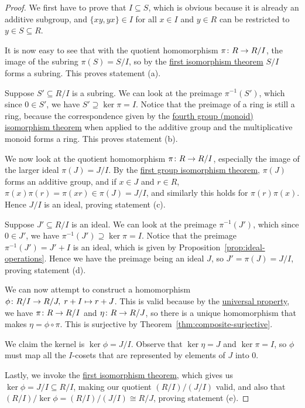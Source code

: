 \begin{proof}
    We first have to prove that \(I \subseteq S\),
    which is obvious because it is already an additive subgroup,
    and \(\{xy,yx\} \in I\) for all \(x \in I\) and \(y \in R\)
    can be restricted to \(y \in S \subseteq R\).

    It is now easy to see that
    with the quotient homomorphism \(\pi\colon R\to R/I\),
    the image of the subring \(\pi(S) = S/I\),
    so by the \hyperref[thm:iso-1-group]{first isomorphism theorem}
    \(S/I\) forms a subring.
    This proves statement (a).

    \medskip

    Suppose \(S' \subseteq R/I\) is a subring.
    We can look at the preimage \(\pi^{-1}(S')\),
    which since \(0 \in S'\), we have \(S' \supseteq \ker\pi = I\).
    Notice that the preimage of a ring is still a ring,
    because the correspondence given by
    the \hyperref[thm:iso-4-group]{fourth group (monoid) isomorphism theorem}
    when applied to the additive group and the multiplicative monoid
    forms a ring.
    This proves statement (b).

    \medskip

    We now look at the quotient homomorphism \(\pi\colon R\to R/I\),
    especially the image of the larger ideal \(\pi(J) = J/I\).
    By the \hyperref[thm:iso-1-group]{first group isomorphism theorem},
    \(\pi(J)\) forms an additive group,
    and if \(x \in J\) and \(r \in R\),
    \(\pi(x)\pi(r) = \pi(xr) \in \pi(J) = J/I\),
    and similarly this holds for \(\pi(r)\pi(x)\).
    Hence \(J/I\) is an ideal, proving statement (c).

    \medskip

    Suppose \(J' \subseteq R/I\) is an ideal.
    We can look at the preimage \(\pi^{-1}(J')\),
    which since \(0 \in J'\), we have \(\pi^{-1}(J') \supseteq \ker\pi = I\).
    Notice that the preimage \(\pi^{-1}(J') = J' + I\) is an ideal,
    which is given by Proposition~\ref{prop:ideal-operations}.
    Hence we have the preimage being an ideal \(J\),
    so \(J' = \pi(J) = J/I\),
    proving statement (d).

    \medskip

    We can now attempt to construct a homomorphism
    \(\phi\colon R/I\to R/J,\;r+I\mapsto r+J\).
    This is valid because
    by the \hyperref[thm:univ-prop-quotient-ring]{universal property},
    we have \(\pi\colon R\to R/I\) and \(\eta\colon R\to R/J\),
    so there is a unique homomorphism that makes \(\eta = \phi\circ\pi\).
    This is surjective by Theorem~\ref{thm:composite-surjective}.

    We claim the kernel is \(\ker\phi = J/I\).
    Observe that \(\ker\eta = J\) and \(\ker\pi = I\),
    so \(\phi\) must map all the \(I\)-cosets
    that are represented by elements of \(J\) into \(0\).

    Lastly, we invoke the \hyperref[thm:iso-1-ring]{first isomorphism theorem},
    which gives us \(\ker\phi = J/I \subseteq R/I\),
    making our quotient \((R/I)/(J/I)\) valid,
    and also that \((R/I)/\ker\phi = (R/I)/(J/I) \cong R/J\),
    proving statement (e).
\end{proof}

